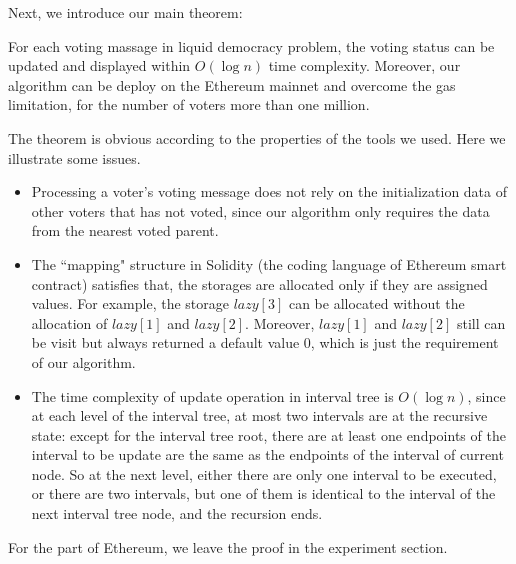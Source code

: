 Next, we introduce our main theorem:
\begin{theorem}
	For each voting massage in liquid democracy problem, the voting status can be updated and displayed within $O(\log n)$ time complexity. Moreover, our algorithm can be deploy on the Ethereum mainnet and overcome the gas limitation, for the number of voters more than one million.
\end{theorem}
The theorem is obvious according to the properties of the tools we used. Here we illustrate some issues.
\begin{itemize}
	\item Processing a voter's voting message does not rely on the initialization data of other voters that has not voted, since our algorithm only requires the data from the nearest voted parent.
	\item The ``mapping" structure in Solidity (the coding language of Ethereum smart contract) satisfies that, the storages are allocated only if they are assigned values. For example, the storage $lazy[3]$ can be allocated without the allocation of $lazy[1]$ and $lazy[2]$. Moreover, $lazy[1]$ and $lazy[2]$ still can be visit but always returned a default value 0, which is just the requirement of our algorithm.
	\item The time complexity of update operation in interval tree is $O(\log n)$, since at each level of the interval tree, at most two intervals are at the recursive state: except for the interval tree root, there are at least one endpoints of the interval to be update are the same as the endpoints of the interval of current node. So at the next level, either there are only one interval to be executed, or there are two intervals, but one of them is identical to the interval of the next interval tree node, and the recursion ends. 
\end{itemize}
For the part of Ethereum, we leave the proof in the experiment section.